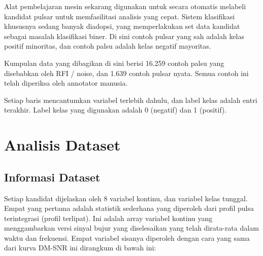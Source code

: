 \documentclass[12pt]{article}
\begin{document}
Alat pembelajaran mesin sekarang digunakan untuk secara otomatis melabeli kandidat pulsar untuk memfasilitasi analisis yang cepat. Sistem klasifikasi khususnya sedang banyak diadopsi, yang memperlakukan set data kandidat sebagai masalah klasifikasi biner. Di sini contoh pulsar yang sah adalah kelas positif minoritas, dan contoh palsu adalah kelas negatif mayoritas.

Kumpulan data yang dibagikan di sini berisi 16.259 contoh palsu yang disebabkan oleh RFI / noise, dan 1.639 contoh pulsar nyata. Semua contoh ini telah diperiksa oleh annotator manusia.

Setiap baris mencantumkan variabel terlebih dahulu, dan label kelas adalah entri terakhir. Label kelas yang digunakan adalah 0 (negatif) dan 1 (positif).

\hspace{1 cm}

\newpage


\section{Analisis Dataset}

    \subsection{Informasi Dataset}
    
    \newline Setiap kandidat dijelaskan oleh 8 variabel kontinu, dan variabel kelas tunggal. Empat yang pertama adalah statistik sederhana yang diperoleh dari profil pulsa terintegrasi (profil terlipat). Ini adalah array variabel kontinu yang menggambarkan versi sinyal bujur yang diselesaikan yang telah dirata-rata dalam waktu dan frekuensi. Empat variabel sisanya diperoleh dengan cara yang sama dari kurva DM-SNR ini dirangkum di bawah ini:
    
\end{document}
